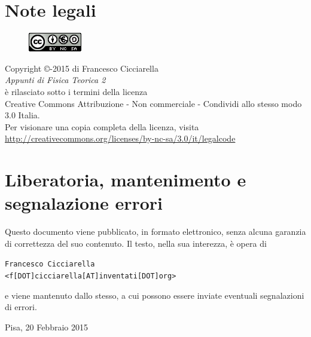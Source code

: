 \documentclass[12pt,a4paper]{article}
\theoremstyle{definition}
\numberwithin{equation}{section}
\begin{document}
\section*{Note legali}
\begin{center}
\begin{figure}[htbp]
\centering
\includegraphics[scale=1]{Addons/88x31.png}
\end{figure}
\vspace{0.5cm}
Copyright \copyright {}-2015 di Francesco Cicciarella \\
\textit{Appunti di Fisica Teorica 2} \\	
è rilasciato sotto i termini della licenza \\
Creative Commons Attribuzione - Non commerciale - Condividi allo stesso modo 3.0 Italia. \\
Per visionare una copia completa della licenza, visita \\
\url{http://creativecommons.org/licenses/by-nc-sa/3.0/it/legalcode}
\end{center}
\section*{Liberatoria, mantenimento e segnalazione errori}
Questo documento viene pubblicato, in formato elettronico, senza alcuna garanzia di correttezza del suo contenuto. Il testo, nella sua interezza, è opera di \\

\vspace{0.3cm}
\begin{flushleft}
\texttt{Francesco Cicciarella}\\
\texttt{<f[DOT]cicciarella[AT]inventati[DOT]org>}
\end{flushleft}
\vspace{0.3cm}
e viene mantenuto dallo stesso, a cui possono essere inviate eventuali segnalazioni di errori.
\vspace{1cm}
\begin{flushright}
Pisa, 20 Febbraio 2015
\end{flushright}
\pagebreak


\tableofcontents
\pagebreak
{}
\end{document}
